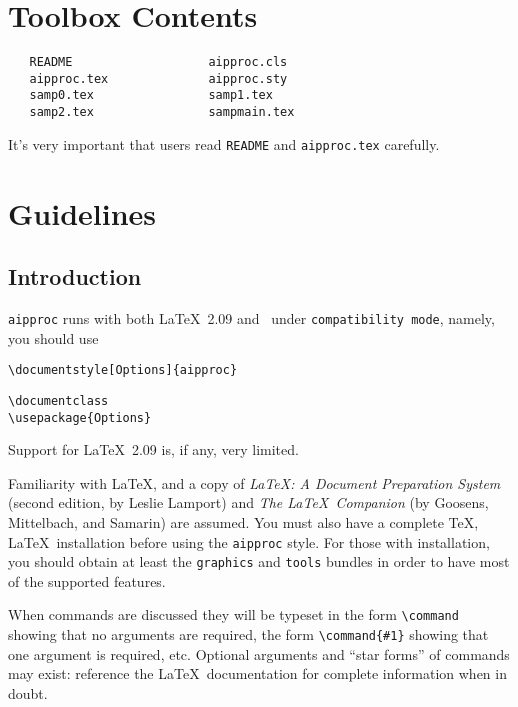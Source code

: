\section{Toolbox Contents}

\begin{verbatim}
   README                   aipproc.cls
   aipproc.tex              aipproc.sty
   samp0.tex                samp1.tex
   samp2.tex                sampmain.tex
\end{verbatim}

It's very important that users read \verb+README+ and
\verb+aipproc.tex+ carefully.
 

\section{Guidelines}

\subsection{Introduction}

{\tt aipproc} runs with both \LaTeX~2.09 and \latexe\ under {\tt compatibility 
mode}, namely, you should use 

\begin{verbatim}
\documentstyle[Options]{aipproc}
\end{verbatim}

\begin{verbatim}
\documentclass
\usepackage{Options}
\end{verbatim}


Support for \LaTeX~2.09 is, if any, very limited.

Familiarity with
\LaTeX, and a copy of {\it \LaTeX: A Document Preparation System}
(second edition, by Leslie Lamport) 
and {\it The \LaTeX~Companion} (by Goosens, Mittelbach, and Samarin)
are assumed. You must also have a complete 
\TeX, \LaTeX\ installation before using the \verb+aipproc+ style.
For those with \latexe{} installation, you should  obtain at least the 
\verb+graphics+ and \verb+tools+ bundles in order to have most of the
supported features.

When commands are discussed they will be typeset in the form
\verb+\command+
showing that no arguments are required, the form
\verb+\command{#1}+
showing that one argument is required, etc.
Optional arguments and ``star forms'' of commands may exist: reference the
\LaTeX\ documentation for complete information when in doubt.

